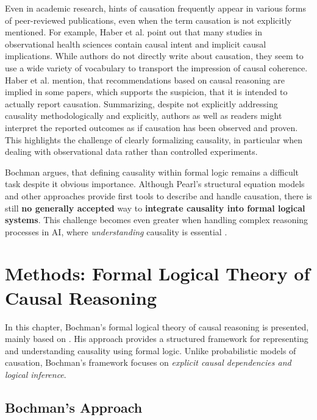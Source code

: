 \documentclass[seminar,palatino,english]{AIGpaper}
\begin{document}
Even in academic research, hints of causation frequently appear in various forms of peer-reviewed publications, even when the term \glqq{}causation\grqq{} is not explicitly mentioned. For example, Haber et al. \cite{haber_causal_2022} point out that many studies in observational health sciences contain causal intent and implicit causal implications. While authors do not directly write about causation, they seem to use a wide variety of vocabulary to transport the impression of causal coherence. Haber et al. mention, that recommendations based on causal reasoning are implied in some papers, which supports the suspicion, that it is intended to actually report causation. Summarizing, despite not explicitly addressing causality methodologically and explicitly, authors as well as readers might interpret the reported outcomes as if causation has been observed and proven. This highlights the challenge of clearly formalizing causality, in particular when dealing with observational data rather than controlled experiments.

Bochman argues, that defining causality within formal logic remains a difficult task despite it obvious importance. Although Pearl’s structural equation models and other approaches provide first tools to describe and handle causation, there is still \textbf{no generally accepted} way to \textbf{integrate causality into formal logical systems}. This challenge becomes even greater when handling complex reasoning processes in AI, where \emph{understanding} causality is essential \cite{bochman_default_2023}.



\section{Methods: Formal Logical Theory of Causal Reasoning}

In this chapter, Bochman’s formal logical theory of causal reasoning is presented, mainly based on \cite{bochman_logical_2021, bochman_causal_2024}. His approach provides a structured framework for representing and understanding causality using formal logic. Unlike probabilistic models of causation, Bochman’s framework focuses on \emph{explicit causal dependencies and logical inference}. 


\subsection{Bochman's Approach}
\end{document}
